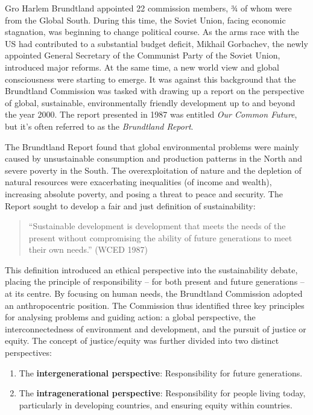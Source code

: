 \documentclass[
  a4paper,
  DIV=11,
  numbers=noendperiod,
  oneside,
  openany]{scrreprt}
\providecommand{\tightlist}{%
  \setlength{\itemsep}{0pt}\setlength{\parskip}{0pt}}
\begin{document}
Gro Harlem Brundtland appointed 22 commission members, ¾ of whom were
from the Global South. During this time, the Soviet Union, facing
economic stagnation, was beginning to change political course. As the
arms race with the US had contributed to a substantial budget deficit,
Mikhail Gorbachev, the newly appointed General Secretary of the
Communist Party of the Soviet Union, introduced major reforms. At the
same time, a new world view and global consciousness were starting to
emerge. It was against this background that the Brundtland Commission
was tasked with drawing up a report on the perspective of global,
sustainable, environmentally friendly development up to and beyond the
year 2000. The report presented in 1987 was entitled \emph{Our Common
Future}, but it's often referred to as the \emph{Brundtland Report}.

The Brundtland Report found that global environmental problems were
mainly caused by unsustainable consumption and production patterns in
the North and severe poverty in the South. The overexploitation of
nature and the depletion of natural resources were exacerbating
inequalities (of income and wealth), increasing absolute poverty, and
posing a threat to peace and security. The Report sought to develop a
fair and just definition of sustainability:

\begin{quote}
``Sustainable development is development that meets the needs of the
present without compromising the ability of future generations to meet
their own needs.'' (WCED 1987)
\end{quote}

This definition introduced an ethical perspective into the
sustainability debate, placing the principle of responsibility -- for
both present and future generations -- at its centre. By focusing on
human needs, the Brundtland Commission adopted an anthropocentric
position. The Commission thus identified three key principles for
analysing problems and guiding action: a global perspective, the
interconnectedness of environment and development, and the pursuit of
justice or equity. The concept of justice/equity was further divided
into two distinct perspectives:

\begin{enumerate}
\def\labelenumi{\arabic{enumi}.}
\tightlist
\item
  The \textbf{intergenerational perspective}: Responsibility for future
  generations.
\item
  The \textbf{intragenerational perspective}: Responsibility for people
  living today, particularly in developing countries, and ensuring
  equity within countries.
\end{enumerate}
\end{document}
